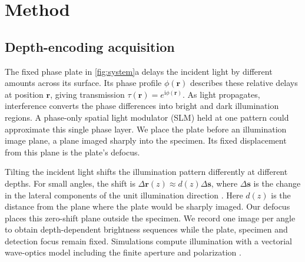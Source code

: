 \section{Method}
\label{sec:imaging}

\subsection{Depth-encoding acquisition}
\label{sec:acquisition}

The fixed phase plate in \cref{fig:system}a delays the incident light by different amounts across its surface. Its phase profile $\phi(\mathbf r)$ describes these relative delays at position $\mathbf r$, giving transmission $\tau(\mathbf r)=e^{\mathrm i\phi(\mathbf r)}$. As light propagates, interference converts the phase differences into bright and dark illumination regions. A phase-only spatial light modulator (SLM) held at one pattern could approximate this single phase layer. We place the plate before an illumination image plane, a plane imaged sharply into the specimen. Its fixed displacement from this plane is the plate's defocus.

Tilting the incident light shifts the illumination pattern differently at different depths. For small angles, the shift is $\Delta\mathbf r(z)\approx d(z)\Delta\mathbf s$, where $\Delta\mathbf s$ is the change in the lateral components of the unit illumination direction \cite{feng1988,freund1988}. Here $d(z)$ is the distance from the plane where the plate would be sharply imaged. Our defocus places this zero-shift plane outside the specimen. We record one image per angle to obtain depth-dependent brightness sequences while the plate, specimen and detection focus remain fixed. Simulations compute illumination with a vectorial wave-optics model including the finite aperture and polarization \cite{richards1959,marian2007}.

